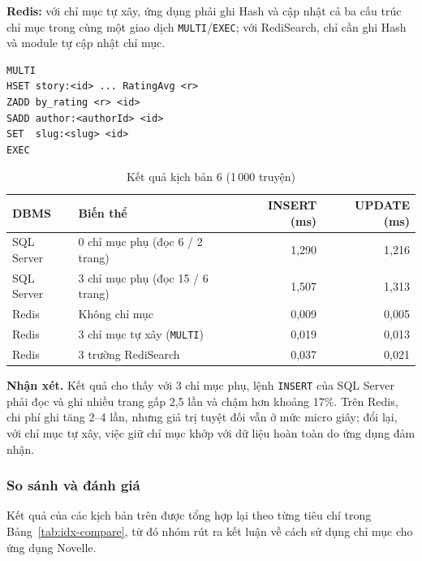 \textbf{Redis:} với chỉ mục tự xây, ứng dụng phải ghi Hash và cập nhật cả ba cấu trúc chỉ mục trong cùng một giao dịch \texttt{MULTI}/\texttt{EXEC}; với RediSearch, chỉ cần ghi Hash và module tự cập nhật chỉ mục.

\begin{verbatim}
MULTI
HSET story:<id> ... RatingAvg <r>
ZADD by_rating <r> <id>
SADD author:<authorId> <id>
SET  slug:<slug> <id>
EXEC
\end{verbatim}

\begin{table}[H]
\centering\small
\begin{tabular}{|l|l|r|r|}
\hline
\textbf{DBMS} & \textbf{Biến thể} & \textbf{INSERT (ms)} & \textbf{UPDATE (ms)} \\ \hline
SQL Server & 0 chỉ mục phụ (đọc 6 / 2 trang) & 1,290 & 1,216 \\ \hline
SQL Server & 3 chỉ mục phụ (đọc 15 / 6 trang) & 1,507 & 1,313 \\ \hline
Redis & Không chỉ mục & 0,009 & 0,005 \\ \hline
Redis & 3 chỉ mục tự xây (\texttt{MULTI}) & 0,019 & 0,013 \\ \hline
Redis & 3 trường RediSearch & 0,037 & 0,021 \\ \hline
\end{tabular}
\caption{Kết quả kịch bản 6 (1\,000 truyện)}
\label{tab:idx-i7}
\end{table}

\textbf{Nhận xét.} Kết quả cho thấy với 3 chỉ mục phụ, lệnh \texttt{INSERT} của SQL Server phải đọc và ghi nhiều trang gấp 2,5 lần và chậm hơn khoảng 17\%. Trên Redis, chi phí ghi tăng 2--4 lần, nhưng giá trị tuyệt đối vẫn ở mức micro giây; đổi lại, với chỉ mục tự xây, việc giữ chỉ mục khớp với dữ liệu hoàn toàn do ứng dụng đảm nhận.

\subsubsection{So sánh và đánh giá}
\label{subsubsec:indexing-compare}

Kết quả của các kịch bản trên được tổng hợp lại theo từng tiêu chí trong Bảng~\ref{tab:idx-compare}, từ đó nhóm rút ra kết luận về cách sử dụng chỉ mục cho ứng dụng Novelle.

